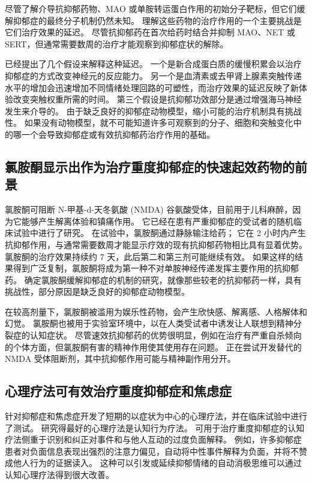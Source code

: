 尽管了解介导抗抑郁药物、MAO 或单胺转运蛋白作用的初始分子靶标，但它们缓解抑郁症的最终分子机制仍然未知。 理解这些药物的治疗作用的一个主要挑战是它们治疗效果的延迟。 尽管抗抑郁药在首次给药时结合并抑制 MAO、NET 或 SERT，但通常需要数周的治疗才能观察到抑郁症状的解除。

已经提出了几个假设来解释这种延迟。 一个是新合成蛋白质的缓慢积累会以治疗抑郁症的方式改变神经元的反应能力。 另一个是血清素或去甲肾上腺素突触传递水平的增加会迅速增加不同情绪处理回路的可塑性，而治疗效果的延迟反映了新体验改变突触权重所需的时间。 第三个假设是抗抑郁功效部分是通过增强海马神经发生来介导的。 由于缺乏良好的抑郁症动物模型，缩小可能的治疗机制具有挑战性。 如果没有动物模型，就不可能知道许多可观察到的分子、细胞和突触变化中的哪一个会导致抑郁症或有效抗抑郁药治疗作用的基础。

\subsection{氯胺酮显示出作为治疗重度抑郁症的快速起效药物的前景}
氯胺酮可阻断 N-甲基-d-天冬氨酸 (NMDA) 谷氨酸受体，目前用于儿科麻醉，因为它能够产生解离体验和镇痛作用。 它已经在患有严重抑郁症的受试者的随机临床试验中进行了研究。 在试验中，氯胺酮通过静脉输注给药； 它在 2 小时内产生抗抑郁作用，与通常需要数周才能显示疗效的现有抗抑郁药物相比具有显着优势。 氯胺酮的治疗效果持续约 7 天，此后第二和第三剂可能继续有效。 如果这样的结果得到广泛复制，氯胺酮将成为第一种不对单胺神经传递发挥主要作用的抗抑郁药。 确定氯胺酮缓解抑郁症的机制的研究，就像那些较老的抗抑郁药一样，具有挑战性，部分原因是缺乏良好的抑郁症动物模型。

在较高剂量下，氯胺酮被滥用为娱乐性药物，会产生欣快感、解离感、人格解体和幻觉。 氯胺酮也被用于实验室环境中，以在人类受试者中诱发让人联想到精神分裂症的认知症状。 尽管速效抗抑郁药的优势很明显，例如在治疗有严重自杀倾向的个体方面，但氯胺酮有害的精神作用使其使用存在问题。 正在尝试开发替代的 NMDA 受体阻断剂，其中抗抑郁作用可能与精神副作用分开。

\subsection{心理疗法可有效治疗重度抑郁症和焦虑症}
针对抑郁症和焦虑症开发了短期的以症状为中心的心理疗法，并在临床试验中进行了测试。 研究得最好的心理疗法是认知行为疗法。 可用于治疗重度抑郁症的认知疗法侧重于识别和纠正对事件和与他人互动的过度负面解释。 例如，许多抑郁症患者对负面信息表现出强烈的注意力偏见，自动将中性事件解释为负面，并将不赞成他人行为的证据读入。 这种可以引发或延续抑郁情绪的自动消极思维可以通过认知心理疗法得到很大改善。

